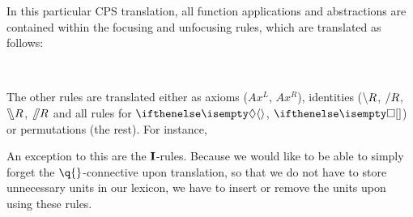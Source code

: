\documentclass[10pt,a4paper]{llncs}
\begin{document}
In this particular CPS translation, all function applications and
abstractions are contained within the focusing and unfocusing rules,
which are translated as follows:
\begin{center}
  \begin{scprooftree*}
  \end{scprooftree*}
  \begin{scprooftree*}
  \end{scprooftree*}
  \\[1\baselineskip]
  \begin{scprooftree*}
  \end{scprooftree*}
  \begin{scprooftree*}
  \end{scprooftree*}
\end{center}
The other rules are translated either as axioms ($Ax^L$, $Ax^R$),
identities ($\impr R$, $\impl R$, $\himpr R$, $\himpl R$ and all rules
for $\di$, $\sq$) or permutations (the rest). For instance,
\begin{scprooftree}
\end{scprooftree}

An exception to this are the $\I$-rules. Because we would like to
be able to simply forget the $\q{}$-connective upon translation, so
that we do not have to store unnecessary units in our lexicon, we have
to insert or remove the units upon using these rules.
\end{document}
